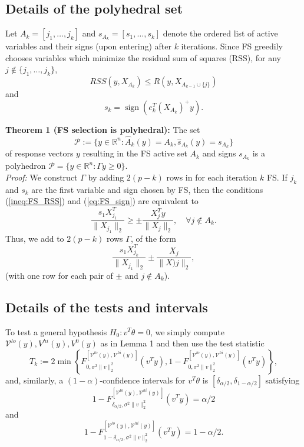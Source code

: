 \documentclass{article}
\newcommand{\R}{\mathbb{R}}                         %
\newcommand{\V}{\mathcal{V}}
\newcommand{\sgn}{\operatorname{sign}}              %
\renewcommand{\hat}{\widehat}
\newcommand{\poly}{\mathcal{P}}
\begin{document}
\subsection{Details of the polyhedral set}
Let $A_k = [j_1,\dots,j_k]$ and $s_{A_k} = [s_1,\dots,s_k]$ denote the ordered
list of active variables and their signs (upon entering) after $k$ iterations.
Since FS greedily chooses variables which minimize the residual sum of squares
(RSS), for any $j \notin \{j_1,\dots,j_k\}$,
\begin{equation}
RSS(y,X_{A_k}) \leq R(y,X_{A_{k - 1} \cup \{j\}})
\label{ineq:FS_RSS}
\end{equation}
and
\begin{equation}
s_k = \sgn(e_k^T (X_{A_k})^+ y).
\label{eq:FS_sign}
\end{equation}

{\bf Theorem 1 (FS selection is polyhedral):} The set
\[\poly := \{y \in \R^n : \hat A_k(y) = A_k, \hat s_{A_k}(y) = s_{A_k}\}\]
of response vectors $y$ resulting in the FS active set $A_k$ and signs
$s_{A_k}$ is a polyhedron $\poly = \{y \in \R^n : \Gamma y \geq 0\}$. \\

\emph{Proof:}
We construct $\Gamma$ by adding $2(p - k)$ rows in for each iteration $k$ FS.
If $j_k$ and $s_k$ are the first variable and sign chosen by FS, then the
conditions (\ref{ineq:FS_RSS}) and (\ref{eq:FS_sign}) are equivalent
to
\[\frac{s_1X_{j_1}^T}{\|X_{j_1}\|_2} \geq \pm \frac{X_j^Ty}{\|X_j\|_2},
    \quad \forall j \notin A_k.\]
Thus, we add to $2(p - k)$ rows $\Gamma$, of the form
\[\frac{s_1X_{j_k}^T}{\|X_{j_1}\|_2} \pm \frac{X_j}{\|X)j\|_2},\]
(with one row for each pair of $\pm$ and $j \notin A_k$).

\subsection{Details of the tests and intervals}
To test a general hypothesis $H_0 : v^T \theta = 0$, we simply compute
$\V^{lo}(y),V^{hi}(y),V^0(y)$ as in Lemma 1 and then use the test statistic
\[T_k := 2\min\left\{ F^{[\V^{lo}(y),\V^{hi}(y)]}_{0,\sigma^2\|v\|_2^2}(v^T y),
        1 - F^{[\V^{lo}(y),\V^{hi}(y)]}_{0,\sigma^2\|v\|_2^2}(v^T y)\right\},\]
and, similarly, a $(1 - \alpha)$-confidence intervals for $v^T \theta$ is
$[\delta_{\alpha/2}, \delta_{1 - \alpha/2}]$ satisfying
\[1 - F^{[\V^{lo}(y),\V^{hi}(y)]}_{\delta_{\alpha/2},\sigma^2\|v\|_2^2}(v^T y)
    = \alpha/2\]
and
\[1 - F^{[\V^{lo}(y),\V^{hi}(y)]}
                    _{1 - \delta_{\alpha/2},\sigma^2\|v\|_2^2}(v^T y)
    = 1 - \alpha/2.\]

%
%
\end{document}
